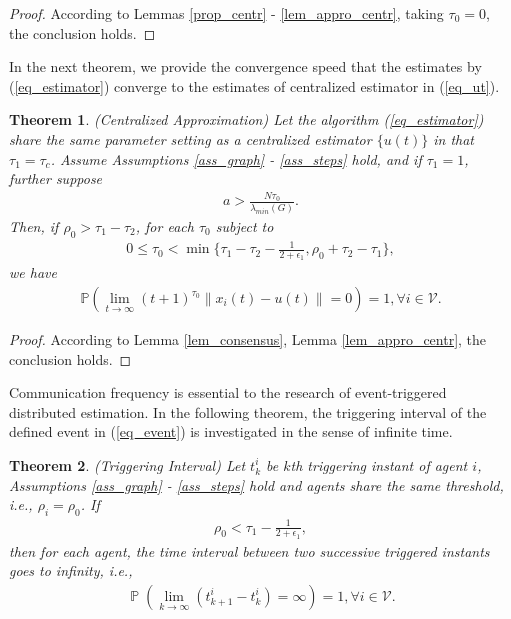 \documentclass[10pt,journal,final]{IEEEtran}
\DeclareMathOperator{\Pro}{\mathbb{P}}
\newcommand{\norm}[1]{\left\lVert#1\right\rVert}
\theoremstyle{plain}
\newtheorem{theorem}{Theorem}[section]
\theoremstyle{definition}
\theoremstyle{remark}
\begin{document}
\begin{proof}
	According to Lemmas \ref{prop_centr} - \ref{lem_appro_centr}, taking $\tau_0=0$, the conclusion holds.
\end{proof}
In the next theorem, we provide the convergence speed that the estimates by (\ref{eq_estimator}) converge to the estimates of centralized estimator in (\ref{eq_ut}).
\begin{theorem}\label{thm_consistency}(Centralized Approximation) 
Let the algorithm (\ref{eq_estimator}) share the same parameter setting  as a centralized estimator $\{u(t)\}$ in that $ \tau_1=\tau_c$. Assume Assumptions \ref{ass_graph} - \ref{ass_steps} hold, and if $\tau_1=1$, further suppose 
\begin{align}
a>\frac{N\tau_0}{\lambda_{min}( G)}.
\end{align}
	Then, if $\rho_0>\tau_1-\tau_2$, for each  $\tau_0$ subject to
			\begin{align*}
	0\leq\tau_0<\min\{\tau_1-\tau_2-\frac{1}{2+\epsilon_1},\rho_0+\tau_2-\tau_1\}, 
	\end{align*}
we have
	\begin{align}\label{eq_cen_app}
	\mathbb{P}\left(\lim\limits_{t\rightarrow\infty}(t+1)^{\tau_0}\norm {x_i(t)-u(t)}=0\right)=1, \forall i\in\mathcal{V}.
	\end{align}
\end{theorem}
\begin{proof}
According to Lemma \ref{lem_consensus}, Lemma \ref{lem_appro_centr}, the conclusion holds.
\end{proof}
Communication frequency is essential to the research of event-triggered distributed estimation. In the following theorem, the triggering interval of the defined event in (\ref{eq_event}) is investigated in the sense of infinite time.
\begin{theorem}\label{thm_triggering}(Triggering Interval)
Let $t_{k}^i$ be $k$th triggering instant of agent $i$, Assumptions \ref{ass_graph} - \ref{ass_steps} hold and agents share the same threshold, i.e., $\rho_i=\rho_0$. If
\begin{align}\label{eq_triggering_upp}
\rho_0<\tau_1-\frac{1}{2+\epsilon_1},
\end{align}
then for each agent, 
 the time interval between two successive triggered instants goes to infinity, i.e., 
\begin{align}\label{eq_limt}
\Pro\left(\lim\limits_{k\rightarrow\infty}(t_{k+1}^i-t_{k}^i)=\infty\right)=1, \forall i\in\mathcal{V}.
\end{align} 
\end{theorem}
\end{document}
